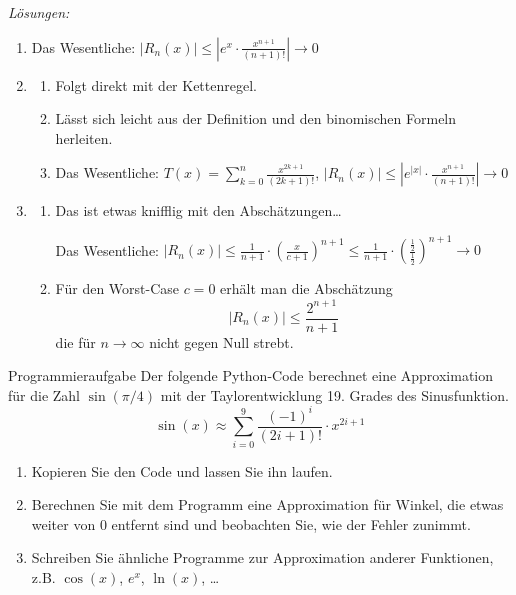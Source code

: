 \clearpage
\emph{Lösungen:}
\begin{enumerate}

	\item Das Wesentliche: \( |R_n(x)| \leq \left|e^x \cdot \frac{x^{n+1}}{(n+1)!} \right| \rightarrow 0 \)



	\item
	      \begin{enumerate}
		      \item Folgt direkt mit der Kettenregel.
		      \item Lässt sich leicht aus der Definition und den binomischen Formeln herleiten.
		      \item Das Wesentliche: \( T(x) = \sum_{k=0}^n \frac{x^{2k+1}}{(2k+1)!} \), \( |R_n(x)| \leq \left|e^{|x|} \cdot \frac{x^{n+1}}{(n+1)!}\right| \rightarrow 0 \)
	      \end{enumerate}

	\item
	      \begin{enumerate}
		      \item Das ist etwas knifflig mit den Abschätzungen\dots

		            Das Wesentliche: \( |R_n(x)| \leq \frac{1}{n+1} \cdot \left(\frac{x}{c+1}\right)^{n+1} \leq \frac{1}{n+1} \cdot \left(\frac{\frac{1}{2}}{\frac{1}{2}}\right)^{n+1} \rightarrow 0\)
		      \item Für den Worst-Case $c=0$ erhält man die Abschätzung
		            $$|R_n(x)| \leq \frac{2^{n+1}}{n+1}$$
		            die für $n\to \infty$ nicht gegen Null strebt.
	      \end{enumerate}
\end{enumerate}


\begin{ueb}
	{Programmieraufgabe}{}
	Der folgende Python-Code berechnet eine Approximation für die Zahl $\sin(\pi/4)$ mit der Taylorentwicklung 19. Grades des Sinusfunktion.
	$$ \sin(x) \approx \sum_{i=0}^{9} \frac{(-1)^i}{(2i+1)!} \cdot x^{2i+1}$$
	
	\begin{enumerate}
		\item Kopieren Sie den Code und lassen Sie ihn laufen.
		\item Berechnen Sie mit dem Programm eine Approximation für Winkel, die etwas weiter von $0$ entfernt sind und beobachten Sie, wie der Fehler zunimmt.
		\item Schreiben Sie ähnliche Programme zur Approximation anderer Funktionen, z.B. $\cos(x)$, $e^x$, $\ln(x)$, \dots
	\end{enumerate}
\end{ueb}

